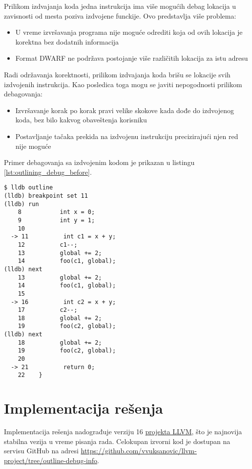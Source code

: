 \documentclass[12pt,oneside]{memoir}
\begin{document}
Prilikom izdvajanja koda jedna instrukcija ima više mogućih debag lokacija u zavisnosti od mesta poziva izdvojene funckije.
Ovo predstavlja više problema:
\begin{itemize}
  \item U vreme izvršavanja programa nije moguće odrediti koja od ovih lokacija je korektna bez dodatnih informacija
  \item Format DWARF ne podržava postojanje više različitih lokacija za istu adresu \cite{dwarf5}
\end{itemize}
Radi održavanja korektnosti, prilikom izdvajanja koda brišu se lokacije svih izdvojenih instrukcija.
Kao posledica toga mogu se javiti nepogodnosti prilikom debagovanja:
\begin{itemize}
  \item Izvršavanje korak po korak pravi velike skokove kada dođe do izdvojenog koda, bez bilo kakvog obaveštenja korisniku
  \item Postavljanje tačaka prekida na izdvojenu instrukciju precizirajući njen red nije moguće
\end{itemize}

Primer debagovanja sa izdvojenim kodom je prikazan u listingu \ref{lst:outlining_debug_before}.

\begin{listing}
\begin{verbatim}
$ lldb outline
(lldb) breakpoint set 11
(lldb) run
    8           int x = 0;
    9           int y = 1;
    10          
  -> 11          int c1 = x + y;
    12          c1--;
    13          global += 2;
    14          foo(c1, global);
(lldb) next
    13          global += 2;
    14          foo(c1, global);
    15          
  -> 16          int c2 = x + y;
    17          c2--;
    18          global += 2;
    19          foo(c2, global);
(lldb) next
    18          global += 2;
    19          foo(c2, global);
    20          
  -> 21          return 0;
    22    }
\end{verbatim}
\label{lst:outlining_debug_before}
\end{listing}

\chapter{Implementacija rešenja}

Implementacija rešenja nadograđuje verziju 16 \href{https://llvm.org/}{projekta LLVM}, što je najnovija stabilna vezija u vreme pisanja rada.
Celokupan izvorni kod je dostupan na servisu GitHub na adresi \url{https://github.com/vvuksanovic/llvm-project/tree/outline-debug-info}.
\end{document}
